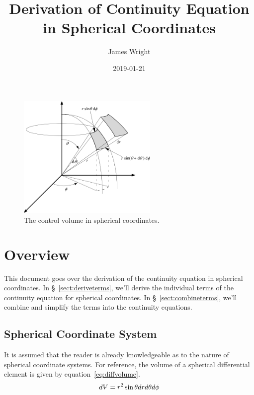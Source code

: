 \documentclass[12pt, letterpaper, twoside]{article}
\title{Derivation of Continuity Equation in Spherical Coordinates}
\author{James Wright}
\date{2019-01-21}
\makeatletter
\DeclareRobustCommand{\volume}{\text{\volumedash}V}
\newcommand{\volumedash}{%
  \makebox[0pt][l]{%
    \ooalign{\hfil\hphantom{$\m@th V$}\hfil\cr\kern0.08em--\hfil\cr}%
  }%
}
\makeatother
\begin{document}
\maketitle

\begin{figure}[h]
    \centering
    \includegraphics[width=0.6\textwidth]{images/control-volume-spherical.png}
    \caption[caption with FN]{The control volume in spherical coordinates.\footnotemark}
    \label{fig:controlvolume}
\end{figure}

\section{Overview}
This document goes over the derivation of the continuity equation in spherical coordinates. 
In \S~\ref{sect:deriveterms}, we'll derive the individual terms of the continuity equation for spherical coordinates.
In \S~\ref{sect:combineterms}, we'll combine and simplify the terms into the continuity equations.

\subsection{Spherical Coordinate System}
    It is assumed that the reader is already knowledgeable as to the nature of spherical coordinate systems.
    For reference, the volume of a spherical differential element is given by equation~\ref{eq:diffvolume}.
    \begin{equation}
        d\volume = r^2 \sin \theta dr d\theta d\phi
        \label{eq:diffvolume}
    \end{equation}
\end{document}
